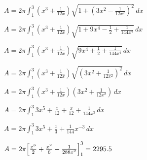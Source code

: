 \documentclass[../main.tex]{subfiles}
\begin{document}
\begin{enumerate}[itemsep=0.7cm]
    $A=2\pi \int_1^3 (x^3+\frac{1}{12x})\sqrt{1+(3x^2-\frac{1}{12x^2})^2}\,dx$

    $A=2\pi \int_1^3 (x^3+\frac{1}{12x})\sqrt{1+9x^4-\frac{1}{2}+\frac{1}{144x^4}}\,dx$

    $A=2\pi \int_1^3 (x^3+\frac{1}{12x})\sqrt{9x^4+\frac{1}{2}+\frac{1}{144x^4}}\,dx$

    $A=2\pi \int_1^3 (x^3+\frac{1}{12x})\sqrt{(3x^2+\frac{1}{12x^2})^2}\,dx$

    $A=2\pi \int_1^3 (x^3+\frac{1}{12x})(3x^2+\frac{1}{12x^2})\,dx$

    $A=2\pi \int_1^3 3x^5 +\frac{x}{12}+\frac{x}{12}+\frac{1}{144x^3}\,dx$

    $A=2\pi \int_1^3 3x^5 +\frac{x}{3}+\frac{1}{144}x^{-3}\,dx$

    $A=2\pi\Bigl[\frac{x^6}{2}+\frac{x^2}{6}-\frac{1}{288x^2}\Bigr]_1^3=2295.5$

\end{enumerate}


\pagebreak
\end{document}
